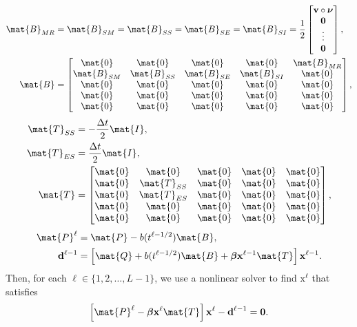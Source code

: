 \documentclass{jpmarticle}
\renewcommand{\vec}[1]{\boldsymbol{\mathrm{#1}}}
\begin{document}
\begin{equation}
  \begin{split}
    \mat{B}_{MR} &= \mat{B}_{SM} = \mat{B}_{SS} = \mat{B}_{SE} = \mat{B}_{SI}
    =
    \frac{1}{2}
    \begin{bmatrix}
      \vec{v} \circ \vec{\nu} \\ \vec{0} \\ \vdots \\ \vec{0}
    \end{bmatrix},
    \\
    \mat{B} &=
    \begin{bmatrix}
      \mat{0} & \mat{0} & \mat{0} & \mat{0} & \mat{B}_{MR}
      \\
      \mat{B}_{SM} & \mat{B}_{SS} & \mat{B}_{SE} & \mat{B}_{SI} & \mat{0}
      \\
      \mat{0} & \mat{0} & \mat{0} & \mat{0} & \mat{0}
      \\
      \mat{0} & \mat{0} & \mat{0} & \mat{0} & \mat{0}
      \\
      \mat{0} & \mat{0} & \mat{0} & \mat{0} & \mat{0}
    \end{bmatrix},
  \end{split}
\end{equation}
\begin{equation}
  \begin{split}
    \mat{T}_{SS} &=
    - \frac{\Delta t}{2} \mat{I},
    \\
    \mat{T}_{ES} &=
    \frac{\Delta t}{2} \mat{I},
    \\
    \mat{T} &=
    \begin{bmatrix}
      \mat{0} & \mat{0} & \mat{0} & \mat{0} & \mat{0}
      \\
      \mat{0} & \mat{T}_{SS} & \mat{0} & \mat{0} & \mat{0}
      \\
      \mat{0} & \mat{T}_{ES} & \mat{0} & \mat{0} & \mat{0}
      \\
      \mat{0} & \mat{0} & \mat{0} & \mat{0} & \mat{0}
      \\
      \mat{0} & \mat{0} & \mat{0} & \mat{0} & \mat{0}
    \end{bmatrix},
  \end{split}
\end{equation}
\begin{equation}
  \begin{split}
    \mat{P}^{\ell} &=
    \mat{P} - b(t^{\ell - 1 / 2}) \mat{B},
    \\
    \vec{d}^{\ell - 1} &=
    \left[
      \mat{Q}
      + b(t^{\ell - 1 / 2}) \mat{B}
      + \vec{\beta} \vec{x}^{\ell - 1} \mat{T}
    \right] \vec{x}^{\ell - 1}.
  \end{split}
\end{equation}
Then, for each $\ell \in \{1, 2, \ldots, L - 1\}$,
we use a nonlinear solver to find $\vec{x}^{\ell}$ that satisfies
\begin{equation}
  \left[
    \mat{P}^{\ell}
    - \vec{\beta} \vec{x}^{\ell} \mat{T}
  \right] \vec{x}^{\ell}
  - \vec{d}^{\ell - 1}
  = \vec{0}.
\end{equation}
\end{document}
